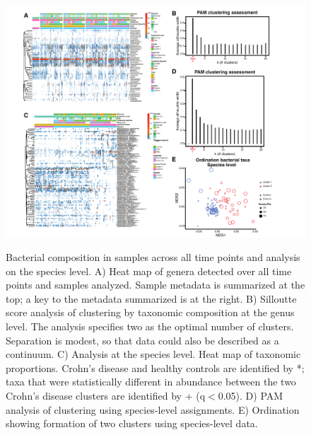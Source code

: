 \begin{figure}[p]
\centering
{\includegraphics[scale=0.62,trim=20 0 0 0,clip]{Figure/F2S1_heatmap.pdf}}
\caption[Bacterial composition in samples across all time points and analysis on the species level]{Bacterial composition in samples across all time points and analysis on the species level. A) Heat map of genera detected over all time points and samples analyzed. Sample metadata is summarized at the top; a key to the metadata summarized is at the right. B) Silloutte score analysis of clustering by taxonomic composition at the genus level. The analysis specifies two as the optimal number of clusters. Separation is modest, so that data could also be described as a continuum. C) Analysis at the species level. Heat map of taxonomic proportions. Crohn’s disease and healthy controls are identified by *; taxa that were statistically different in abundance between the two Crohn’s disease clusters are identified by + (q$<$0.05). D) PAM analysis of clustering using species-level assignments. E) Ordination showing formation of two clusters using species-level data. }
\label{F2S1_heatmap}
\end{figure}

